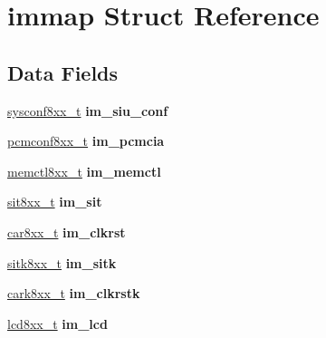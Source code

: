 \hypertarget{structimmap}{}\section{immap Struct Reference}
\label{structimmap}
\subsection*{Data Fields}
\begin{DoxyCompactItemize}
\item 
\mbox{\label{structimmap_a22831ba8baa748b88f7f32849d8cf5ce}} 
\mbox{\hyperlink{structsys__conf}{sysconf8xx\+\_\+t}} {\bfseries im\+\_\+siu\+\_\+conf}
\item 
\mbox{\label{structimmap_ac0c797e7e6cca0ce56897b19f9c0524e}} 
\mbox{\hyperlink{structpcmcia__conf}{pcmconf8xx\+\_\+t}} {\bfseries im\+\_\+pcmcia}
\item 
\mbox{\label{structimmap_a9385a9fdb716185bb7c551b0ab8a8ddc}} 
\mbox{\hyperlink{structmem__ctlr}{memctl8xx\+\_\+t}} {\bfseries im\+\_\+memctl}
\item 
\mbox{\label{structimmap_a7aa310e568af362e76a3d6cabffe68f2}} 
\mbox{\hyperlink{structsys__int__timers}{sit8xx\+\_\+t}} {\bfseries im\+\_\+sit}
\item 
\mbox{\label{structimmap_adf2832b016c991b5c23c732dbd66737d}} 
\mbox{\hyperlink{structclk__and__reset}{car8xx\+\_\+t}} {\bfseries im\+\_\+clkrst}
\item 
\mbox{\label{structimmap_a9b64dd40fe15868d88f6001ce8ac0962}} 
\mbox{\hyperlink{structsitk}{sitk8xx\+\_\+t}} {\bfseries im\+\_\+sitk}
\item 
\mbox{\label{structimmap_a47e94457501d80d1f21b6e24075d81d9}} 
\mbox{\hyperlink{structcark}{cark8xx\+\_\+t}} {\bfseries im\+\_\+clkrstk}
\item 
\mbox{\label{structimmap_ae304582f9ef3844a767c7e984d750297}} 
\mbox{\hyperlink{structlcd}{lcd8xx\+\_\+t}} {\bfseries im\+\_\+lcd}
\item 
\mbox{\label{structimmap_a0296008464be39766d52ae4ee17e44b4}} 

\end{DoxyCompactItemize}
